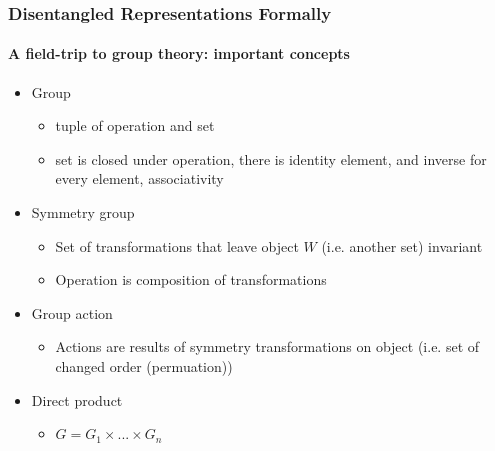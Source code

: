 \documentclass[9pt]{beamer}
\begin{document}
\begin{frame}
\frametitle{Disentangled Representations Formally}
\framesubtitle{A field-trip to group theory: important concepts}
\begin{itemize}%
	\item Group
	\begin{itemize}
		\item tuple of operation and set
		\item set is closed under operation, there is identity element, and inverse for every element, associativity
	\end{itemize}
	\item Symmetry group
	\begin{itemize}
		\item Set of transformations that leave object $W$ (i.e. another set) invariant
		\item Operation is composition of transformations
	\end{itemize}
	\item Group action
	\begin{itemize}
		\item Actions are results of symmetry transformations on object (i.e. set of changed order (permuation))
	\end{itemize}
	\item Direct product
	\begin{itemize}
		\item $G = G_1 \times ... \times G_n$
	\end{itemize}
 \end{itemize}
\end{frame} 
\end{document}
